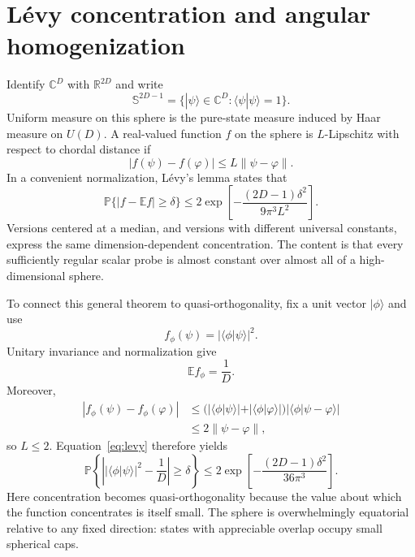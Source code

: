 \documentclass[aps,pra,reprint,superscriptaddress,nofootinbib,longbibliography]{revtex4-2}
\newcommand{\ket}[1]{| #1 \rangle}
\newcommand{\E}{\mathbb{E}}
\newcommand{\PP}{\mathbb{P}}
\begin{document}
\section{L\'evy concentration and angular homogenization}
\label{sec:levy}

Identify $\mathbb C^D$ with $\mathbb R^{2D}$ and write
\begin{equation}
 \mathbb S^{2D-1}=\{\ket{\psi}\in\mathbb C^D:
 \langle\psi|\psi\rangle=1\}.
\end{equation}
Uniform measure on this sphere is the pure-state measure induced by Haar
measure on $U(D)$.  A real-valued function $f$ on the sphere is
$L$-Lipschitz with respect to chordal distance if
\begin{equation}
 |f(\psi)-f(\varphi)|\leq L\|\psi-\varphi\|.
 \label{eq:lipschitz}
\end{equation}
In a convenient normalization, L\'evy's lemma states that
\cite{milman1986asymptotic,ledoux2001concentration,Hayden2006}
\begin{equation}
 \PP\{|f-\E f|\geq\delta\}
 \leq 2\exp\!\left[-\frac{(2D-1)\delta^2}{9\pi^3L^2}\right].
 \label{eq:levy}
\end{equation}
Versions centered at a median, and versions with different universal
constants, express the same dimension-dependent concentration.  The content
is that every sufficiently regular scalar probe is almost constant over
almost all of a high-dimensional sphere.

To connect this general theorem to quasi-orthogonality, fix a unit vector
$\ket{\phi}$ and use
\begin{equation}
 f_\phi(\psi)=|\langle\phi|\psi\rangle|^2.
 \label{eq:overlap-function}
\end{equation}
Unitary invariance and normalization give
\begin{equation}
 \E f_\phi=\frac1D.
 \label{eq:haar-overlap-mean-preview}
\end{equation}
Moreover,
\begin{align}
 |f_\phi(\psi)-f_\phi(\varphi)|
 &\leq
 \bigl(|\langle\phi|\psi\rangle|+|\langle\phi|\varphi\rangle|\bigr)
 |\langle\phi|\psi-\varphi\rangle| \nonumber\\
 &\leq2\|\psi-\varphi\|,
\end{align}
so $L\leq2$.  Equation~\eqref{eq:levy} therefore yields
\begin{equation}
 \PP\!\left\{
 \left||\langle\phi|\psi\rangle|^2-\frac1D\right|\geq\delta
 \right\}
 \leq2\exp\!\left[-\frac{(2D-1)\delta^2}{36\pi^3}\right].
 \label{eq:levy-overlap}
\end{equation}
Here concentration becomes quasi-orthogonality because the value about which
the function concentrates is itself small.  The sphere is overwhelmingly
equatorial relative to any fixed direction: states with appreciable overlap
occupy small spherical caps.
\end{document}
